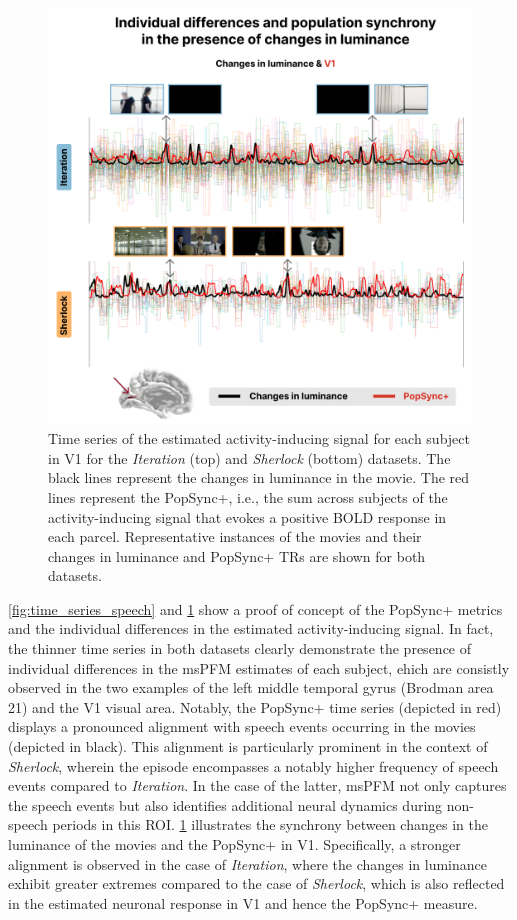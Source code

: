 \begin{figure}[!ht]
\centering
\includegraphics[width=0.9\linewidth]{figures/multi_subject/time_luminance.png}
\caption[]{Time series of the estimated activity-inducing signal for each
subject in V1 for the \textit{Iteration} (top) and \textit{Sherlock} (bottom)
datasets. The black lines represent the changes in luminance in the movie. The
red lines represent the PopSync+, i.e., the sum across subjects of the
activity-inducing signal that evokes a positive BOLD response in each parcel.
Representative instances of the movies and their changes in luminance and
PopSync+ TRs are shown for both datasets.}
\label{fig:time_series_luminance}
\end{figure}

\cref{fig:time_series_speech} and \cref{fig:time_series_luminance} show a proof
of concept of the PopSync+ metrics and the individual differences in the
estimated activity-inducing signal. In fact, the thinner time series in both
datasets clearly demonstrate the presence of individual differences in the msPFM
estimates of each subject, ehich are consistly observed in the two examples of
the left middle temporal gyrus (Brodman area 21) and the V1 visual area.
Notably, the PopSync+ time series (depicted in red) displays a
pronounced alignment with speech events occurring in the movies (depicted in
black). This alignment is particularly prominent in the context of
\textit{Sherlock}, wherein the episode encompasses a notably higher frequency of
speech events compared to \textit{Iteration}. In the case of the latter, msPFM
not only captures the speech events but also identifies additional neural
dynamics during non-speech periods in this ROI. \cref{fig:time_series_luminance}
illustrates the synchrony between changes in the luminance of the movies and the
PopSync+ in V1. Specifically, a stronger alignment is observed in the case of
\textit{Iteration}, where the changes in luminance exhibit greater extremes
compared to the case of \textit{Sherlock}, which is also reflected in the
estimated neuronal response in V1 and hence the PopSync+ measure.

